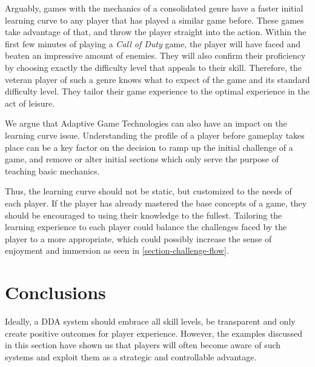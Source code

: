 \documentclass[cic,tc,english]{iiufrgs}
\begin{document}
Arguably, games with the mechanics of a consolidated genre have a faster initial learning curve to any player that has played a similar game before. These games take advantage of that, and throw the player straight into the action. Within the first few minutes of playing a \emph{Call of Duty} game, the player will have faced and beaten an impressive amount of enemies. They will also confirm their proficiency by choosing exactly the difficulty level that appeals to their skill. Therefore, the veteran player of such a genre knows what to expect of the game and its standard difficulty level. They tailor their game experience to the optimal experience in the act of leisure.

We argue that Adaptive Game Technologies can also have an impact on the learning curve issue. Understanding the profile of a player before gameplay takes place can be a key factor on the decision to ramp up the initial challenge of a game, and remove or alter initial sections which only serve the purpose of teaching basic mechanics.

Thus, the learning curve should not be static, but customized to the needs of each player. If the player has already mastered the base concepts of a game, they should be encouraged to using their knowledge to the fullest. Tailoring the learning experience to each player could balance the challenges faced by the player to a more appropriate, which could possibly increase the sense of enjoyment and immersion as seen in \autoref{section-challenge-flow}.

\section{Conclusions}

Ideally, a DDA system should embrace all skill levels, be transparent and only create positive outcomes for player experience. However, the examples discussed in this section have shown us that players will often become aware of such systems and exploit them as a strategic and controllable advantage. 


\end{document}
